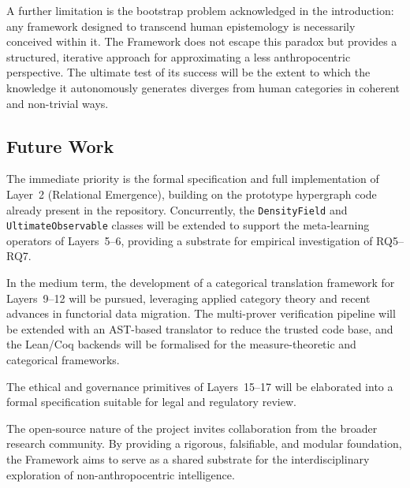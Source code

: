 A further limitation is the bootstrap problem acknowledged in the introduction: any framework designed to transcend human epistemology is necessarily conceived within it. The \Apeiron{} Framework does not escape this paradox but provides a structured, iterative approach for approximating a less anthropocentric perspective. The ultimate test of its success will be the extent to which the knowledge it autonomously generates diverges from human categories in coherent and non-trivial ways.

\subsection{Future Work}

The immediate priority is the formal specification and full implementation of Layer~2 (Relational Emergence), building on the prototype hypergraph code already present in the repository. Concurrently, the \texttt{DensityField} and \texttt{UltimateObservable} classes will be extended to support the meta-learning operators of Layers~5--6, providing a substrate for empirical investigation of RQ5--RQ7.

In the medium term, the development of a categorical translation framework for Layers~9--12 will be pursued, leveraging applied category theory \cite{fong2019} and recent advances in functorial data migration. The multi-prover verification pipeline will be extended with an AST-based translator to reduce the trusted code base, and the Lean/Coq backends will be formalised for the measure-theoretic and categorical frameworks.

The ethical and governance primitives of Layers~15--17 will be elaborated into a formal specification suitable for legal and regulatory review.

The open-source nature of the project invites collaboration from the broader research community. By providing a rigorous, falsifiable, and modular foundation, the \Apeiron{} Framework aims to serve as a shared substrate for the interdisciplinary exploration of non-anthropocentric intelligence.